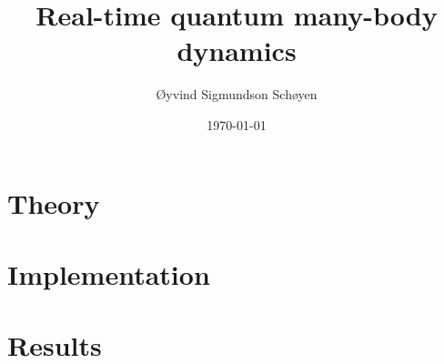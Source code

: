 \documentclass[twoside, english, notitlepage, 12pt]{uiofysmaster}
\author{Øyvind Sigmundson Schøyen}
\title{Real-time quantum many-body dynamics}
\date{\today}
\begin{document}
\frontmatter
    \maketitle

    \begin{abstract}
        
    \end{abstract}

    \begin{acknowledgements}
        
    \end{acknowledgements}

    \tableofcontents

\mainmatter

    

    \part{Theory}
        
        

        
        
        

    \part{Implementation}
        

        

        

    \part{Results}
        
        
        
\end{document}
